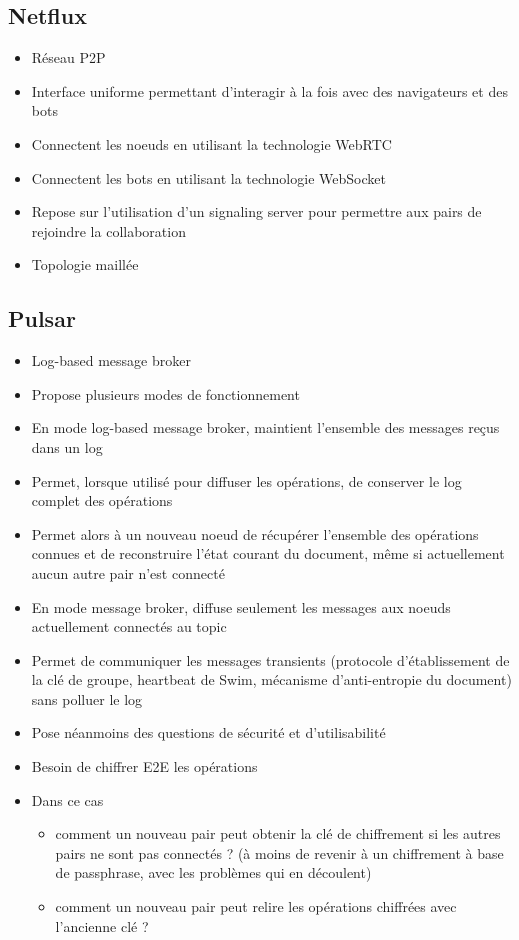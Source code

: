 \documentclass[12pt]{thesul}
\begin{document}
\subsection{Netflux}
\begin{itemize}
  \item Réseau P2P
  \item Interface uniforme permettant d'interagir à la fois avec des navigateurs et des bots
  \item Connectent les noeuds en utilisant la technologie WebRTC
  \item Connectent les bots en utilisant la technologie WebSocket
  \item Repose sur l'utilisation d'un signaling server pour permettre aux pairs de rejoindre la collaboration
  \item Topologie maillée
\end{itemize}
\subsection{Pulsar}
\begin{itemize}
  \item Log-based message broker
  \item Propose plusieurs modes de fonctionnement
  \item En mode log-based message broker, maintient l'ensemble des messages reçus dans un log
  \item Permet, lorsque utilisé pour diffuser les opérations, de conserver le log complet des opérations
  \item Permet alors à un nouveau noeud de récupérer l'ensemble des opérations connues et de reconstruire l'état courant du document, même si actuellement aucun autre pair n'est connecté
  \item En mode message broker, diffuse seulement les messages aux noeuds actuellement connectés au topic
  \item Permet de communiquer les messages transients (protocole d'établissement de la clé de groupe, heartbeat de Swim, mécanisme d'anti-entropie du document) sans polluer le log
  \item Pose néanmoins des questions de sécurité et d'utilisabilité
  \item Besoin de chiffrer E2E les opérations
  \item Dans ce cas
    \begin{itemize}
      \item comment un nouveau pair peut obtenir la clé de chiffrement si les autres pairs ne sont pas connectés ? (à moins de revenir à un chiffrement à base de passphrase, avec les problèmes qui en découlent)
      \item comment un nouveau pair peut relire les opérations chiffrées avec l'ancienne clé ?
    \end{itemize}
\end{itemize}
\end{document}
